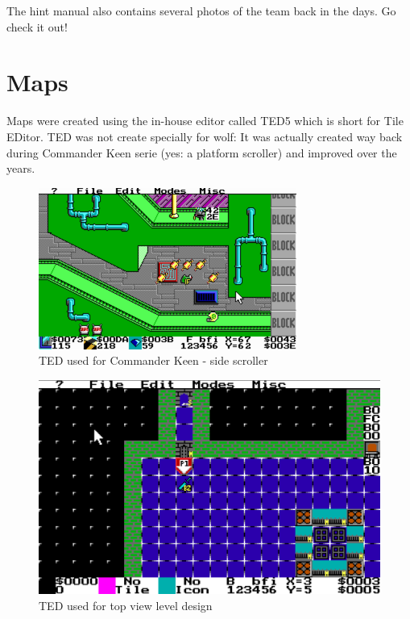 \documentclass[book.tex]{subfiles}
\begin{document}
\par 
The hint manual also contains several photos of the team back in the days. Go check it out!













\section{Maps}
Maps were created using the in-house editor called TED5 which is short for Tile EDitor. TED was not create specially for wolf: It was actually created way back during Commander Keen serie (yes: a platform scroller) and improved over the years.\\

 \begin{figure}[H]
\centering
 \includegraphics[width=\textwidth]{imgs/ted5_scrolling_map.png}
 \caption{TED used for Commander Keen - side scroller} 
 \end{figure}


\begin{figure}[H]
\centering
 \includegraphics[width=\textwidth]{imgs/TED.png}
 \caption{TED used for top view level design} 
 \end{figure}
\end{document}
